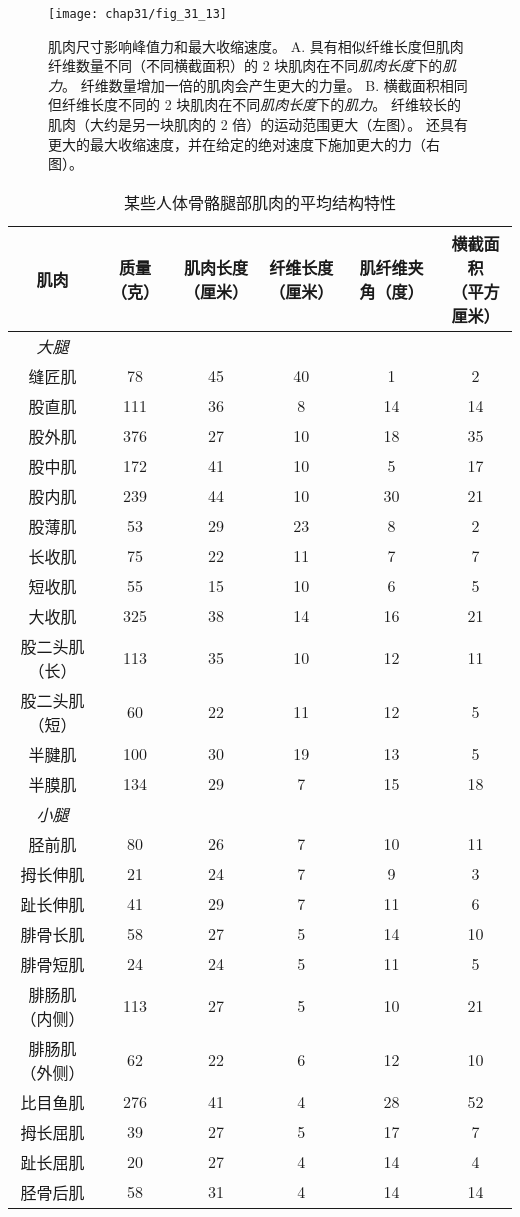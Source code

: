 \begin{figure}[htbp]
	\centering
	\texttt{[image: chap31/fig\_31\_13]}
	\caption{肌肉尺寸影响峰值力和最大收缩速度\cite{lieber2000functional}。
	A. 具有相似纤维长度但肌肉纤维数量不同（不同横截面积）的 2 块肌肉在不同\textit{肌肉长度}下的\textit{肌力}。
	纤维数量增加一倍的肌肉会产生更大的力量。
	B. 横截面积相同但纤维长度不同的 2 块肌肉在不同\textit{肌肉长度}下的\textit{肌力}。
	纤维较长的肌肉（大约是另一块肌肉的 2 倍）的运动范围更大（左图）。
	还具有更大的最大收缩速度，并在给定的绝对速度下施加更大的力（右图）。}
	\label{fig:31_13}
\end{figure}


\begin{table}[htbp]
	\caption{某些人体骨骼腿部肌肉的平均结构特性\label{tab:31_2}}
	\centering
	\begin{tabular}{cccccc}
		\toprule
		肌肉 & 质量（克） & 肌肉长度（厘米） & 纤维长度（厘米） & 肌纤维夹角（度） & \makecell[l]{横截面积\\（平方厘米）} \\
		\midrule
		\textit{大腿} &   &  & & & \\
		缝匠肌 & 78 & 45 & 40 & 1 & 2 \\
		股直肌 & 111 & 36 & 8 & 14 & 14 \\
		股外肌 & 376 & 27 & 10 & 18 & 35 \\
		股中肌 & 172 & 41 & 10 & 5 & 17 \\
		股内肌 & 239 & 44 & 10 & 30 & 21 \\
		股薄肌 & 53 & 29 & 23 & 8 & 2 \\
		长收肌 & 75 & 22 & 11 & 7 & 7 \\
		短收肌 & 55 & 15 & 10 & 6 & 5 \\
		大收肌 & 325 & 38 & 14 & 16 & 21 \\
		股二头肌（长） & 113 & 35 & 10 & 12 & 11 \\
		股二头肌（短） & 60 & 22 & 11 & 12 & 5 \\
		半腱肌 & 100 & 30 & 19 & 13 & 5 \\
		半膜肌 & 134 & 29 & 7 & 15 & 18 \\
		\textit{小腿} &   &  & & & \\
		胫前肌 & 80 & 26 & 7 & 10 & 11 \\
		拇长伸肌 & 21 & 24 & 7 & 9 & 3 \\
		趾长伸肌 & 41 & 29 & 7 & 11 & 6 \\
		腓骨长肌 & 58 & 27 & 5 & 14 & 10 \\
		腓骨短肌 & 24 & 24 & 5 & 11 & 5 \\
		腓肠肌（内侧） & 113 & 27 & 5 & 10 & 21 \\
		腓肠肌（外侧） & 62 & 22 & 6 & 12 & 10 \\
		比目鱼肌 & 276 & 41 & 4 & 28 & 52 \\
		拇长屈肌 & 39 & 27 & 5 & 17 & 7 \\
		趾长屈肌 & 20 & 27 & 4 & 14 & 4 \\
		胫骨后肌 & 58 & 31 & 4 & 14 & 14 \\
		\bottomrule
	\end{tabular}
\end{table}


